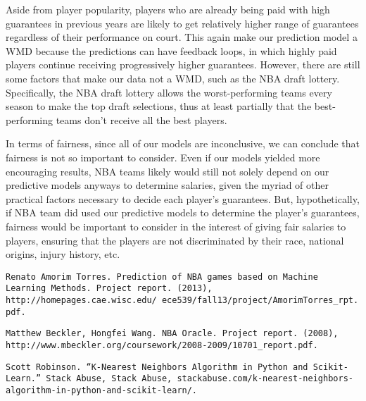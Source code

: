 \documentclass{article}
\begin{document}
Aside from player popularity, players who are already being paid with high guarantees in previous years are likely to get relatively higher range of guarantees regardless of their performance on court. This again make our prediction model a WMD because the predictions can have feedback loops, in which highly paid players continue receiving progressively higher guarantees. However, there are still some factors that make our data not a WMD, such as the NBA draft lottery. Specifically, the NBA draft lottery allows the worst-performing teams every season to make the top draft selections, thus at least partially that the best-performing teams don’t receive all the best players.

In terms of fairness, since all of our models are inconclusive, we can conclude that fairness is not so important to consider. Even if our models yielded more encouraging results, NBA teams likely would still not solely depend on our predictive models anyways to determine salaries, given the myriad of other practical factors necessary to decide each player’s guarantees. But, hypothetically, if NBA team did used our predictive models to determine the player’s guarantees, fairness would be important to consider in the interest of giving fair salaries to players, ensuring that the players are not discriminated by their race, national origins, injury history, etc. 



\begin{thebibliography}{9}

\texttt{Renato Amorim Torres. Prediction of NBA games based on Machine Learning Methods. Project report. (2013), http://homepages.cae.wisc.edu/~ece539/fall13/project/AmorimTorres\_rpt.pdf.}

\texttt{Matthew Beckler, Hongfei Wang. NBA Oracle. Project report. (2008), http://www.mbeckler.org/coursework/2008-2009/10701\_report.pdf.}

\texttt{Scott Robinson. “K-Nearest Neighbors Algorithm in Python and Scikit-Learn.” Stack Abuse, Stack Abuse, stackabuse.com/k-nearest-neighbors-algorithm-in-python-and-scikit-learn/.} 
\end{thebibliography}
\end{document}
